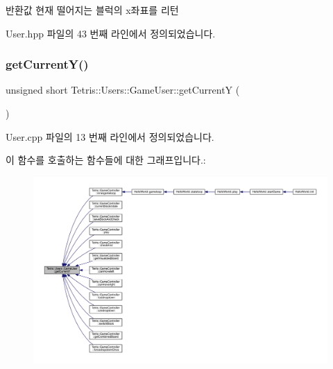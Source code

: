 \begin{DoxyReturn}{반환값}
현재 떨어지는 블럭의 x좌표를 리턴 
\end{DoxyReturn}


User.\+hpp 파일의 43 번째 라인에서 정의되었습니다.

\mbox{\label{class_tetris_1_1_users_1_1_game_user_af5bd7ff0b575af1b42b093488cff97e2}} 
\subsubsection{\texorpdfstring{get\+Current\+Y()}{getCurrentY()}\hspace{0.1cm}{\footnotesize\ttfamily [1/2]}}
{\footnotesize\ttfamily unsigned short Tetris\+::\+Users\+::\+Game\+User\+::get\+CurrentY (\begin{DoxyParamCaption}{ }\end{DoxyParamCaption})}



User.\+cpp 파일의 13 번째 라인에서 정의되었습니다.

이 함수를 호출하는 함수들에 대한 그래프입니다.\+:
\nopagebreak
\begin{figure}[H]
\begin{center}
\leavevmode
\includegraphics[width=350pt]{class_tetris_1_1_users_1_1_game_user_af5bd7ff0b575af1b42b093488cff97e2_icgraph}
\end{center}
\end{figure}
\mbox{\label{class_tetris_1_1_users_1_1_game_user_af5bd7ff0b575af1b42b093488cff97e2}} 
